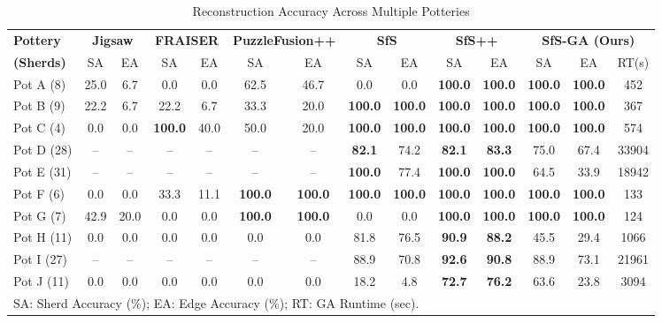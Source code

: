 \documentclass[conference]{IEEEtran}
\begin{document}
\begin{table}[htbp]
\caption{Reconstruction Accuracy Across Multiple Potteries}
\begin{center}
\small
\setlength{\tabcolsep}{4.5pt}
\begin{tabular}{l cc cc cc cc cc ccc}
\hline\hline
\textbf{Pottery} & \multicolumn{2}{c}{\textbf{Jigsaw} \cite{b13}} & \multicolumn{2}{c}{\textbf{FRAISER} \cite{b14}} & \multicolumn{2}{c}{\textbf{PuzzleFusion++} \cite{b15}} & \multicolumn{2}{c}{\textbf{SfS} \cite{b16}} & \multicolumn{2}{c}{\textbf{SfS++} \cite{b2}} & \multicolumn{3}{c}{\textbf{SfS-GA (Ours)}} \\
\cline{2-3} \cline{4-5} \cline{6-7} \cline{8-9} \cline{10-11} \cline{12-14}
\textbf{(Sherds)} & SA & EA & SA & EA & SA & EA & SA & EA & SA & EA & SA & EA & RT(s) \\
\hline
Pot A (8)   & 25.0 & 6.7  & 0.0   & 0.0  & 62.5  & 46.7 & 0.0   & 0.0   & \textbf{100.0} & \textbf{100.0} & \textbf{100.0} & \textbf{100.0} & 452 \\
Pot B (9)   & 22.2 & 6.7  & 22.2  & 6.7  & 33.3  & 20.0 & \textbf{100.0} & \textbf{100.0} & \textbf{100.0} & \textbf{100.0} & \textbf{100.0} & \textbf{100.0} & 367 \\
Pot C (4)   & 0.0  & 0.0  & \textbf{100.0} & 40.0 & 50.0  & 20.0 & \textbf{100.0} & \textbf{100.0} & \textbf{100.0} & \textbf{100.0} & \textbf{100.0} & \textbf{100.0} & 574 \\
Pot D (28)  & --   & --   & --    & --   & --    & --   & \textbf{82.1}  & 74.2  & \textbf{82.1}  & \textbf{83.3}  & 75.0  & 67.4  & 33904 \\
Pot E (31)  & --   & --   & --    & --   & --    & --   & \textbf{100.0} & 77.4  & \textbf{100.0} & \textbf{100.0} & 64.5  & 33.9  & 18942 \\
Pot F (6)   & 0.0  & 0.0  & 33.3  & 11.1 & \textbf{100.0} & \textbf{100.0} & \textbf{100.0} & \textbf{100.0} & \textbf{100.0} & \textbf{100.0} & \textbf{100.0} & \textbf{100.0} & 133 \\
Pot G (7)   & 42.9 & 20.0 & 0.0   & 0.0  & \textbf{100.0} & \textbf{100.0} & 0.0   & 0.0   & \textbf{100.0} & \textbf{100.0} & \textbf{100.0} & \textbf{100.0} & 124 \\
Pot H (11)  & 0.0  & 0.0  & 0.0   & 0.0  & 0.0   & 0.0  & 81.8  & 76.5  & \textbf{90.9}  & \textbf{88.2}  & 45.5  & 29.4  & 1066 \\
Pot I (27)  & --   & --   & --    & --   & --    & --   & 88.9  & 70.8  & \textbf{92.6}  & \textbf{90.8}  & 88.9  & 73.1  & 21961 \\
Pot J (11)  & 0.0  & 0.0  & 0.0   & 0.0  & 0.0   & 0.0  & 18.2  & 4.8   & \textbf{72.7}  & \textbf{76.2}  & 63.6  & 23.8  & 3094 \\
\hline
\multicolumn{14}{l}{\footnotesize SA: Sherd Accuracy (\%); EA: Edge Accuracy (\%); RT: GA Runtime (sec).}
\end{tabular}
\label{tab2}
\end{center}
\end{table}
\end{document}
